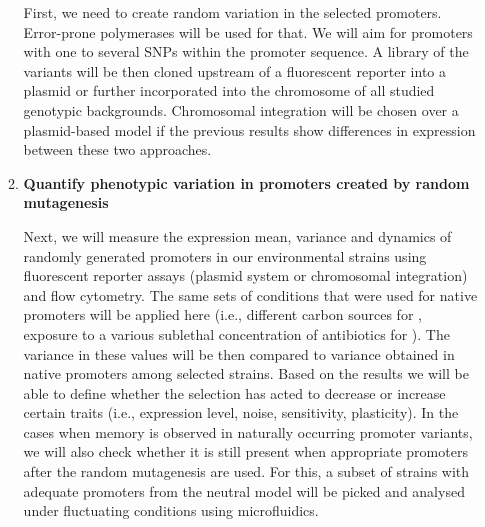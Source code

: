 \begin{enumerate}[font=\bfseries]
\begin{enumerate}[font=\bfseries]
        First, we need to create random variation in the selected promoters.
        Error-prone polymerases will be used for that.
        We will aim for promoters with one to several SNPs within the promoter sequence.
        A library of the variants will be then cloned upstream of a fluorescent reporter into a plasmid or further incorporated into the chromosome of all studied genotypic backgrounds.
        Chromosomal integration will be chosen over a plasmid-based model if the previous results show differences in expression between these two approaches.

        \item \textbf{Quantify phenotypic variation in promoters created by random mutagenesis}
        
        Next, we will measure the expression mean, variance and dynamics of randomly generated promoters in our environmental strains using fluorescent reporter assays (plasmid system or chromosomal integration) and flow cytometry.
        The same sets of conditions that were used for native promoters will be applied here (i.e., different carbon sources for , exposure to a various sublethal concentration of antibiotics for ).
        The variance in these values will be then compared to variance obtained in native promoters among selected strains.
        Based on the results we will be able to define whether the selection has acted to decrease or increase certain traits (i.e., expression level, noise, sensitivity, plasticity).
        In the cases when memory is observed in naturally occurring promoter variants, we will also check whether it is still present when appropriate promoters after the random mutagenesis are used.
        For this, a subset of strains with adequate promoters from the neutral model will be picked and analysed under fluctuating conditions using microfluidics.
    
    \end{enumerate}

\end{enumerate}

\cleardoublepage%

\shorthandon{-} 
